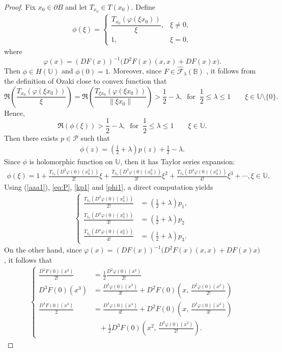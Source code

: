 \documentclass[10pt,a4paper]{amsart}
\newcommand{\bea}{\begin{eqnarray}}
\newcommand{\eea}{\end{eqnarray}}
\begin{document}
\begin{proof} Fix $x_0\in \partial B$ and let $T_{x_0}\in T(x_0)$. Define
\bea\label{aaa1}
\phi(\xi)=
\begin{cases}
\dfrac{T_{x_0}\!\left(\varphi(\xi x_0)\right)}{\xi}, & \xi\neq 0,\\[2mm]
1, & \xi=0,
\end{cases}
\eea
where
\[
\varphi(x)=(DF(x))^{-1}\bigl(D^2F(x)(x,x)+DF(x)x\bigl).
\]
Then $\phi\in H(\mathbb U)$ and $\phi(0)=1$. Moreover, since
$F\in \widehat{\mathcal{F}}_{\lambda}(\mathbb{B})$ , it follows from the definition of Ozaki close to convex function that
\[
\Re\!\left(\frac{T_{x_0}\!\left(\varphi(\xi x_0)\right)}{\xi}\right)
=
\Re\!\left(\frac{T_{\xi x_0}\!\left(\varphi(\xi x_0)\right)}{\|\xi x_0\|}\right)>\frac{1}{2}-\lambda,\;\;\text{for}\;\;\frac{1}{2}\leq \lambda \leq 1
\qquad \xi\in\mathbb U\setminus\{0\}.
\]
Hence,
\[\Re\!\left(\phi(\xi)\right)>\frac{1}{2}-\lambda,\;\;\text{for}\;\;\frac{1}{2}\leq \lambda \leq 1\qquad \xi\in\mathbb U.
\]
 Then there exists $p\in \mathcal{P}$ such that 
\bea\label{kp1}\phi(z)=\left(\frac{1}{2}+\lambda\right) p(z)+\frac{1}{2}-\lambda.\eea
Since $\phi$ is holomorphic function on $\mathbb{U}$, then it has Taylor series expansion:
\bea\label{phi1}\phi(\xi)=1+\frac{T_{x_0}(D^2\varphi(0)(x_0^2))}{2!}\xi+\frac{T_{x_0}(D^3\varphi(0)(x_0^3))}{3!}\xi^2+\frac{T_{x_0}(D^4\varphi(0)(x_0^4))}{4!}\xi^3+\cdots,\xi\in \mathbb{U}.\eea
Using (\ref{aaa1}), \eqref{eq:P}, \eqref{kp1} and \eqref{phi1}, a direct computation yields
\bea\label{qq1}
\begin{cases} \frac{T_{x_0}(D^2\varphi(0)(x_0^2))}{2!}&=\left(\frac{1}{2}+\lambda\right)p_1,\\
 \frac{T_{x_0}(D^3\varphi(0)(x_0^3))}{3!}&=\left(\frac{1}{2}+\lambda\right)p_2\\
\frac{T_{x_0}(D^4\varphi(0)(x_0^4))}{4!}&=\left(\frac{1}{2}+\lambda\right)p_3.
\end{cases}
\eea
On the other hand, since $\varphi(x)=(DF(x))^{-1}\bigl(D^2F(x)(x,x)+DF(x)x\bigl)$, it follows that
\bea\label{qqq2}
\begin{cases}
\frac{D^{2}F(0)(x^{2})}{2!}&=\frac{1}{2}\frac{D^{2}\varphi(0)(x^{2})}{2!}\\
 D^{3}F(0)(x^{3})&=\frac{D^{3}\varphi(0)(x^{3})}{3!}+D^{2}F(0)\!\left(x,\,\frac{D^{2}\varphi(0)(x^{2})}{2!}\right)\\
\frac{D^{4}F(0)(x^{4})}{2}&=\frac{D^{4}\varphi(0)(x^{4})}{4!}+D^{2}F(0)\!\left(x,\,\frac{D^{3}\varphi(0)(x^{3})}{3!}\right)\\
&\;\;\;+\frac{1}{2}D^{3}F(0)\!\left(x^{2},\,\frac{D^{2}\varphi(0)(x^{2})}{2!}\right).
\end{cases}\eea


\end{proof}
\end{document}

